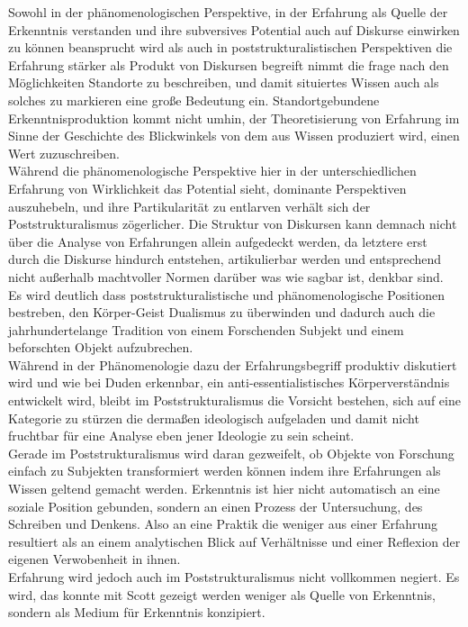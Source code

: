 Sowohl in der phänomenologischen Perspektive, in der Erfahrung als Quelle der
Erkenntnis verstanden und ihre subversives Potential auch auf Diskurse
einwirken zu können beansprucht wird\footnotemark {} als auch in poststrukturalistischen
Perspektiven die Erfahrung stärker als Produkt von Diskursen begreift\footnotemark {} nimmt
die frage nach den Möglichkeiten Standorte zu beschreiben, und damit situiertes
Wissen auch als solches zu markieren eine große Bedeutung ein.
Standortgebundene Erkenntnisproduktion kommt nicht umhin, der Theoretisierung
von Erfahrung im Sinne der Geschichte des Blickwinkels von dem aus Wissen
produziert wird, einen Wert zuzuschreiben.\\
Während die phänomenologische
Perspektive hier in der unterschiedlichen Erfahrung von Wirklichkeit das
Potential sieht, dominante Perspektiven auszuhebeln, und ihre Partikularität
zu entlarven verhält sich der Poststrukturalismus zögerlicher. Die Struktur von
Diskursen kann demnach nicht über die Analyse von Erfahrungen allein aufgedeckt
werden, da letztere erst durch die Diskurse hindurch entstehen, artikulierbar
werden und entsprechend nicht außerhalb machtvoller Normen darüber was wie
sagbar ist, denkbar sind.\\

\noindent Es wird deutlich dass poststrukturalistische und phänomenologische Positionen
bestreben, den Körper-Geist Dualismus zu überwinden und dadurch auch die
jahrhundertelange Tradition von einem Forschenden Subjekt und einem beforschten
Objekt aufzubrechen. \\
Während in der Phänomenologie dazu der Erfahrungsbegriff
produktiv diskutiert wird und wie bei Duden erkennbar, ein
anti-essentialistisches Körperverständnis entwickelt wird, bleibt im
Poststrukturalismus die Vorsicht bestehen, sich auf eine Kategorie zu stürzen
die dermaßen ideologisch aufgeladen und damit nicht fruchtbar für eine Analyse
eben jener Ideologie zu sein scheint. \\
Gerade im Poststrukturalismus wird daran
gezweifelt, ob Objekte von Forschung einfach zu Subjekten transformiert werden
können indem ihre Erfahrungen als Wissen geltend gemacht werden. Erkenntnis ist
hier nicht automatisch an eine soziale Position gebunden, sondern an einen
Prozess der Untersuchung, des Schreiben und Denkens. Also an eine Praktik die
weniger aus einer Erfahrung resultiert als an einem analytischen Blick auf
Verhältnisse und einer Reflexion der eigenen Verwobenheit in ihnen. \\
Erfahrung
wird jedoch auch im Poststrukturalismus nicht vollkommen negiert. Es wird, das
konnte mit Scott gezeigt werden weniger als Quelle von Erkenntnis, sondern als
Medium für Erkenntnis konzipiert.\\

